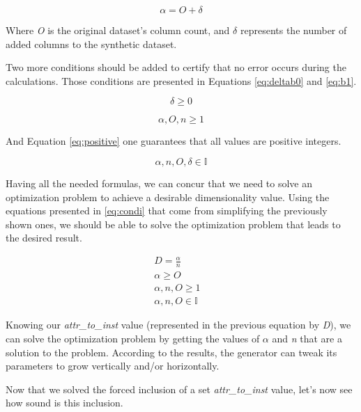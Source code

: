 \begin{equation}
  \label{eq:alpha}
  \alpha = O + \delta
\end{equation}

Where \textit{O} is the original dataset's column count, and $\delta$ represents the number of added columns to the synthetic dataset.

Two more conditions should be added to certify that no error occurs during the calculations. Those conditions are presented in Equations \ref{eq:deltab0} and \ref{eq:b1}.

\begin{equation}
  \label{eq:deltab0}
  \delta \geq 0
\end{equation}

\begin{equation}
  \label{eq:b1}
  \alpha, O, n \geq 1
\end{equation}

And Equation \ref{eq:positive} one guarantees that all values are positive integers.

\begin{equation}
  \label{eq:positive}
  \alpha, n, O, \delta \in \mathbb{I}
\end{equation}

Having all the needed formulas, we can concur that we need to solve an optimization problem to achieve a desirable dimensionality value. Using the equations presented in \ref{eq:condi} that come from simplifying the previously shown ones, we should be able to solve the optimization problem that leads to the desired result.

\begin{equation}
  \label{eq:condi}
  \begin{aligned}
      D = \frac{\alpha}{n} &
      \\\alpha \geq O &
      \\\alpha, n, O \geq 1 &
      \\\alpha, n, O \in \mathbb{I}
  \end{aligned}
\end{equation}

Knowing our \textit{attr\_to\_inst} value (represented in the previous equation by \textit{D}), we can solve the optimization problem by getting the values of $\alpha$ and \textit{n} that are a solution to the problem. According to the results, the generator can tweak its parameters to grow vertically and/or horizontally.

Now that we solved the forced inclusion of a set \textit{attr\_to\_inst} value, let's now see how sound is this inclusion.

